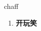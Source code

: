 
\begin{frame}
{\huge chaff}
\begin{center}
\begin{enumerate}\Large
  \item \textbf{开玩笑}
\end{enumerate}
\end{center}
\end{frame}

